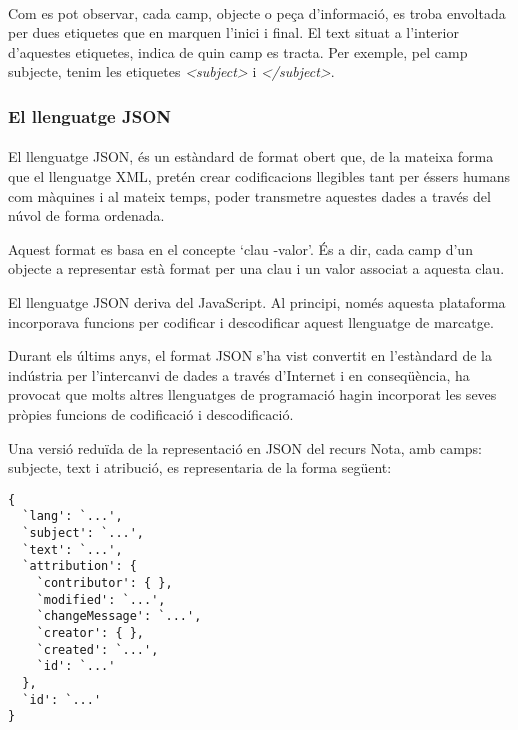         \paragraph{}
        Com es pot observar, cada camp, objecte o peça d'informació, es troba envoltada per dues etiquetes que en marquen l'inici i final. El text situat a l'interior d'aquestes etiquetes, indica de quin camp es tracta. Per exemple, pel camp subjecte, tenim les etiquetes \emph{<subject>} i \emph{</subject>}.


        \subsubsection{El llenguatge JSON}

        \paragraph{}
        El llenguatge \gls{JSON}, és un estàndard de format obert que, de la mateixa forma que el llenguatge XML, pretén crear codificacions llegibles tant per éssers humans com màquines i al mateix temps, poder transmetre aquestes dades a través del núvol de forma ordenada.

        Aquest format es basa en el concepte ‘clau -valor’. És a dir, cada camp d'un objecte a representar està format per una clau i un valor associat a aquesta clau.

        El llenguatge JSON deriva del JavaScript. Al principi, només aquesta plataforma incorporava funcions per codificar i descodificar aquest llenguatge de marcatge.

        Durant els últims anys, el format JSON s'ha vist convertit en l'estàndard de la indústria per l'intercanvi de dades a través d'Internet i en conseqüència, ha provocat que molts altres llenguatges de programació hagin incorporat les seves pròpies funcions de codificació i descodificació.

        Una versió reduïda de la representació en JSON del recurs Nota, amb camps: subjecte, text i atribució, es representaria de la forma següent:

        \begin{lstlisting}[style=XML,caption={Representació bàsica en JSON d'una Nota}]
{
  `lang': `...',
  `subject': `...',
  `text': `...',
  `attribution': {
    `contributor': { },
    `modified': `...',
    `changeMessage': `...',
    `creator': { },
    `created': `...',
    `id': `...'
  },
  `id': `...'
}
        \end{lstlisting}
